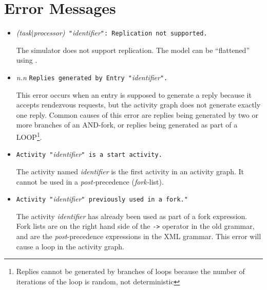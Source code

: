 \section{Error Messages}
\label{sec:normal-error-messages}

\begin{itemize}
\item \emph{(task$|$processor)}\texttt{ "}\emph{identifier}\texttt{":
    Replication not supported.}
  
  The simulator does not support
  replication.  The model can be
  ``flattened'' using
  .

\item \emph{n.n} \texttt{Replies generated by Entry
    "}\emph{identifier}\texttt{".}
  
  This error occurs when an entry is supposed to generate a reply
  because it accepts rendezvous requests, but the
  activity graph does not generate exactly one
  reply.  Common causes of this error are replies
  being generated by two or more branches of an
  AND-fork, or replies being generated as
  part of a LOOP\footnote{Replies cannot be
    generated by branches of loops because the number of iterations of
    the loop is random, not deterministic}.

\item \texttt{Activity "}\emph{identifier}\texttt{" is a start activity.}
  
  The activity named \emph{identifier} is the first activity in an
  activity graph.  It cannot be used in a
  \emph{post-}precedence
  (\emph{fork-}list).

\item \texttt{Activity "}\emph{identifier}\texttt{" previously used in a fork." }
  
  The activity \emph{identifier} has already been used as part of a
  fork expression.  Fork lists are on the right
  hand side of the \texttt{->} operator in the old
  grammar, and are the
  \emph{post}-precedence expressions in
  the XML grammar.  This error will cause a loop in the activity
  graph.


\end{itemize}
